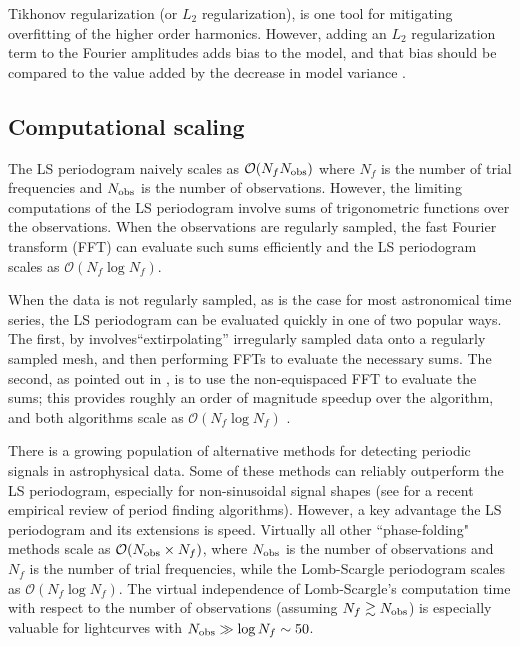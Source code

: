 \documentclass{aastex62}
\newcommand{\bigO}{\mathcal{O}}
\begin{document}
Tikhonov regularization (or $L_2$ regularization), is one tool for mitigating overfitting
of the higher order harmonics. However, adding an $L_2$ regularization term to the Fourier amplitudes
adds bias to the model, and that bias should be compared to the value added by the
decrease in model variance \citep{Vanderplas+Ivezic_2015}.

\subsection{Computational scaling}

The LS periodogram naively scales as $\bigO(N_f N_{\rm obs})$ where $N_f$ is the number of trial
frequencies and $N_{\rm obs}$ is the number of observations. However, the limiting computations
of the LS periodogram involve sums of trigonometric functions over the observations. When
the observations are regularly sampled, the fast Fourier transform (FFT)  \citep{Cooley+Tukey_1965}
can evaluate such sums efficiently and the LS periodogram scales as $\bigO(N_f\log N_f)$.

When the data is not regularly sampled, as is the case for most astronomical time series,
the LS periodogram can be evaluated quickly in one of two popular ways.
The first, by \cite{Press+Rybicki_1989} involves``extirpolating'' irregularly sampled
data onto a regularly sampled mesh, and then performing FFTs to evaluate the necessary sums.
The second, as pointed out in \cite{Leroy_2012}, is to use the non-equispaced FFT \citep[][NFFT]{NFFT_KKD2009,NFFT_DR1993}
to evaluate the sums; this provides roughly an order of magnitude speedup over the \cite{Press+Rybicki_1989}
algorithm, and both algorithms scale as $\bigO(N_f\log N_f)$ \citep{Leroy_2012}.

There is a growing population of alternative methods for detecting
periodic signals in astrophysical data. Some of these methods can reliably
outperform the LS periodogram, especially for non-sinusoidal signal shapes
(see \cite{Graham_etal_2013} for a recent empirical review of period finding algorithms).
However, a key advantage the LS periodogram and its extensions is speed.
Virtually all other ``phase-folding" methods scale as $\bigO(N_{\rm obs}\times N_f)$, where $N_{\rm obs}$ is the number
of observations and $N_f$ is the number of trial frequencies, while the Lomb-Scargle
periodogram scales as $\bigO(N_f\log N_f)$. The virtual independence of Lomb-Scargle's computation
time with respect to the number of observations (assuming $N_f \gtrsim N_{\rm obs}$)
is especially valuable for lightcurves with $N_{\rm obs} \gg \log N_f \sim 50$.
\end{document}
